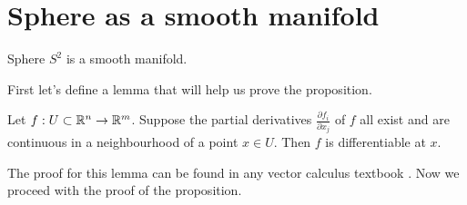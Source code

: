 \documentclass[11pt,a4paper]{report}
\begin{document}
\section{Sphere as a smooth manifold}
\begin{Prop}
    Sphere $S^2$ is a smooth manifold. 
\end{Prop}
\noindent First let's define a lemma that will help us prove the proposition.
\begin{Lemma}\label{contLemma}
  Let $f:U \subset \mathbb{R}^n \to \mathbb{R}^m $. Suppose the partial derivatives $\frac{\partial f_i}{\partial x_j}$ of $f$ all exist
  and are continuous in a neighbourhood of a point $x \in U$. Then $f$ is differentiable at $x$. 
\end{Lemma}
\noindent The proof for this lemma can be found in any vector calculus textbook \cite{3251}. Now we proceed with the proof of the proposition.
\end{document}
